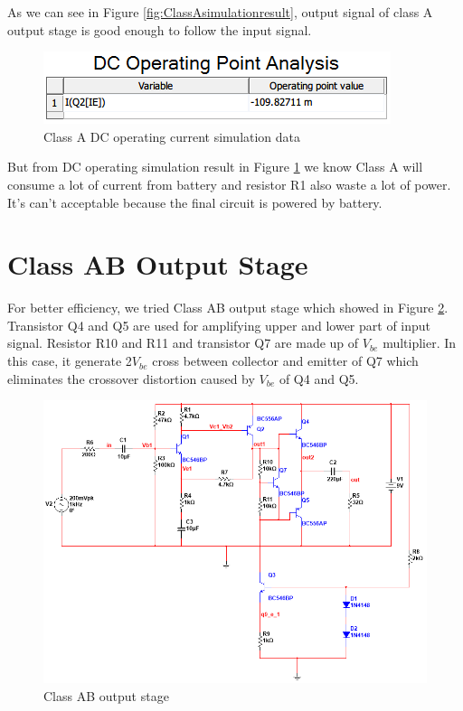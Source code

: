 As we can see in Figure \ref{fig:ClassAsimulationresult}, output signal of class A output stage is good enough to follow the input signal.

\begin{figure}[htbp]
\centering
\includegraphics[scale=1]{"../Photo/Chap4/Class A DC operating current"}
\caption{Class A DC operating current simulation data}
\label{fig:ClassADCoperatingcurrent}
\end{figure}

But from DC operating simulation result in Figure \ref{fig:ClassADCoperatingcurrent} we know Class A will consume a lot of current from battery and resistor R1 also waste a lot of power. It's can't acceptable because the final circuit is powered by battery.


\section{Class AB Output Stage}

For better efficiency, we tried Class AB output stage which showed in Figure \ref{fig:ClassABoutputstage}. Transistor Q4 and Q5 are used for amplifying upper and lower part of input signal. Resistor R10 and R11 and transistor Q7 are made up of $ V_{be}  $ multiplier. In this case, it generate 2$ V_{be} $ cross between collector and emitter of Q7 which eliminates the crossover distortion caused by $ V_{be}  $ of Q4 and Q5.

\begin{figure}[htbp]
\centering
\includegraphics[scale=0.6 ]{"../Photo/Chap4/Class AB output stage"}
\caption{Class AB output stage}
\label{fig:ClassABoutputstage}
\end{figure}



